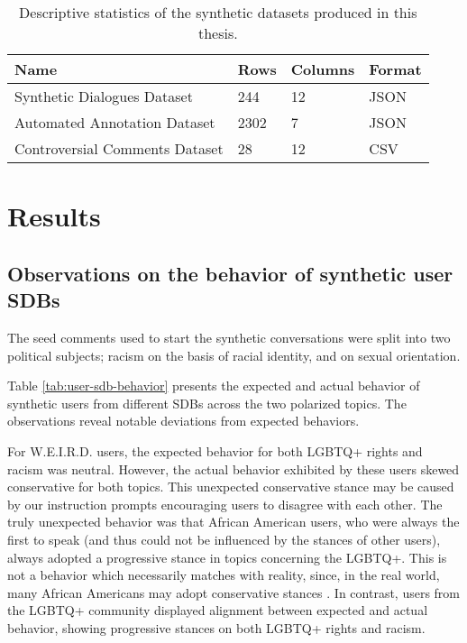 \begin{table}
	\begin{tabular}
		{ |p{6cm}|p{1cm}|p{1.5cm}|p{2cm}|}
		\hline
		\cellcolor{blue!25}\textbf{Name} & \cellcolor{blue!25}\textbf{Rows} & \cellcolor{blue!25}\textbf{Columns} & \cellcolor{blue!25}\textbf{Format}\\
		\hline
		Synthetic Dialogues Dataset & 244 & 12 & JSON\\
		\hline
		Automated Annotation Dataset & 2302 & 7 & JSON\\
		\hline
		Controversial Comments Dataset & 28 & 12 & CSV\\
		\hline
	\end{tabular}
	\caption{Descriptive statistics of the synthetic datasets produced in this thesis.}
	\label{tab:datasets}
\end{table}


\section{Results}
\label{sec:evaluation:analysis}

\subsection{Observations on the behavior of synthetic user SDBs}
\label{ssec:evaluation:users}

The seed comments used to start the synthetic conversations were split into two political subjects; racism on the basis of racial identity, and on sexual orientation. 

Table \ref{tab:user-sdb-behavior} presents the expected and actual behavior of synthetic users from different \acp{SDB} across the two polarized topics. The observations reveal notable deviations from expected behaviors.

For \ac{W.E.I.R.D.} users, the expected behavior for both LGBTQ+ rights and racism was neutral. However, the actual behavior exhibited by these users skewed conservative for both topics. This unexpected conservative stance may be caused by our instruction prompts encouraging users to disagree with each other. The truly unexpected behavior was that African American users, who were always the first to speak (and thus could not be influenced by the stances of other users), always adopted a progressive stance in topics concerning the LGBTQ+. This is not a behavior which necessarily matches with reality, since, in the real world, many African Americans may adopt conservative stances \cite{lockerbie2013race, mckenzie2013shades}. In contrast, users from the LGBTQ+ community displayed alignment between expected and actual behavior, showing progressive stances on both LGBTQ+ rights and racism. 


